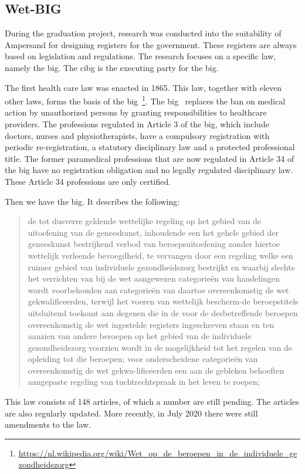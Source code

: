 \subsection{Wet-BIG} \label{section:big}
During the graduation project, research was conducted into the suitability of Ampersand for designing registers for the government.
These registers are always based on legislation and regulations.
The research focuses on a specific law, namely the \acrshort{big}.
The \acrshort{cibg} is the executing party for the \acrshort{big}.

The first health care law was enacted in 1865.
This law, together with eleven other laws, forms the basis of the \acrfull{big}~\footnote{\url{https://nl.wikipedia.org/wiki/Wet_op_de_beroepen_in_de_individuele_gezondheidszorg}}.
The \acrshort{big}~ replaces the ban on medical action by unauthorized persons by granting responsibilities to healthcare providers.
The professions regulated in Article 3 of the \acrshort{big}, which include doctors, nurses and physiotherapists, have a compulsory registration with periodic re-registration, a statutory disciplinary law and a protected professional title.
The former paramedical professions that are now regulated in Article 34 of the \acrshort{big} have no registration obligation and no legally regulated disciplinary law.
These Article 34 professions are only certified.

Then we have the \acrshort{big}.
It describes the following:
\blockquote{de tot dusverre geldende wettelijke regeling op het gebied van de uitoefening van de geneeskunst, inhoudende een het gehele gebied der geneeskunst bestrijkend verbod van beroepsuitoefening zonder hiertoe wettelijk verleende bevoegdheid, te vervangen door een regeling welke een ruimer gebied van individuele gezondheidszorg bestrijkt en waarbij slechts het verrichten van bij de wet
aangewezen categorieën van handelingen wordt voorbehouden aan categorieën van daartoe overeenkomstig de wet gekwalificeerden, terwijl het voeren van wettelijk bescherm-de beroepstitels uitsluitend toekomt aan degenen die in de voor de desbetreffende beroepen overeenkomstig de wet ingestelde registers ingeschreven staan en ten aanzien van andere beroepen op het gebied van de individuele gezondheidszorg voorzien wordt in de mogelijkheid tot het regelen van de opleiding tot die beroepen; 
\newline
voor onderscheidene categorieën van overeenkomstig de wet gekwa-lificeerden een aan de gebleken behoeften aangepaste regeling van tuchtrechtspraak in het leven te roepen; }
This law consists of 148 articles, of which a number are still pending.
The articles are also regularly updated.
More recently, in July 2020 there were still amendments to the law.


